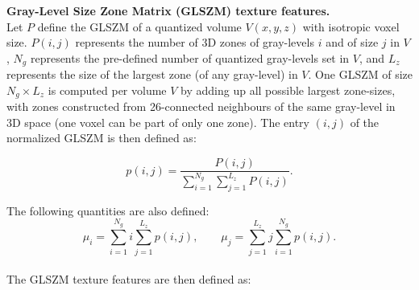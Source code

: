\documentclass{article}
\begin{document}
\noindent \textbf{Gray-Level Size Zone Matrix (GLSZM) texture features.} \\
Let $P$ define the GLSZM of a quantized volume $V(x,y,z)$ with isotropic voxel size. $P(i,j)$ represents the number of 3D zones of gray-levels $i$ and of size $j$ in $V$, $N_g$ represents the pre-defined number of quantized gray-levels set in $V$, and $L_z$ represents the size of the largest zone (of any gray-level) in $V$.  One GLSZM of size $N_g \times L_z$ is computed per volume $V$ by adding up all possible largest zone-sizes, with zones constructed from 26-connected neighbours  of the same gray-level in 3D space (one voxel can be part of only one zone). The entry $(i,j)$ of the normalized GLSZM is then defined as:

\[p(i,j) = \frac{P(i,j)}{\sum_{i=1}^{N_g}\sum_{j=1}^{L_z} P(i,j)}.\]

\noindent The following quantities are also defined:
\[\mu_i = \sum_{i=1}^{N_g} i \sum_{j=1}^{L_z} p(i,j), \qquad \mu_j = \sum_{j=1}^{L_z} j \sum_{i=1}^{N_g} p(i,j).\] \\

\noindent The GLSZM texture features are then defined as:
\end{document}
